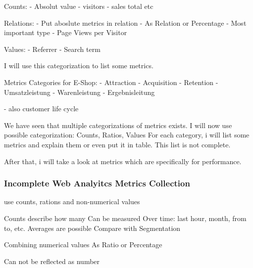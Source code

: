Counts:
- Absolut value
- visitors
- sales total
etc

Relations:
- Put aboslute metrics in relation
- As Relation or Percentage
- Most important type
- Page Views per Visitor

Values:
- Referrer
- Search term 
 

I will use this categorization to list some metrics.



Metrics Categories for E-Shop:
- Attraction
- Acquisition
- Retention
- Umsatzleistung
- Warenleistung
- Ergebnisleitung

- also customer life cycle







We have seen that multiple categorizations of metrics exists.
I will now use possible categorization: Counts, Ratios, Values
For each category, i will list some metrics and explain them or even put it in table.
This list is not complete.

After that, i will take a look at metrics which are specifically for performance.










\subsubsection{Incomplete Web Analyitcs Metrics Collection}

use counts, rations and non-numerical values


Counts describe how many
Can be measured Over time: last hour, month, from to, etc.
Averages are possible
Compare with Segmentation



Combining numerical values
As Ratio or Percentage



Can not be reflected as number



